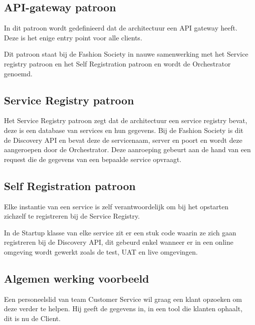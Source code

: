 \subsection{API-gateway patroon}
\label{subsec:API-gateway patroon}

 In dit patroon wordt gedefinieerd dat de architectuur een API gateway heeft. Deze is het enige entry point voor alle clients. \autocite{Richardsonb}
 
 Dit patroon staat bij de Fashion Society in nauwe samenwerking met het Service registry patroon en het Self Registration patroon en wordt de Orchestrator genoemd.
 
 \subsection{Service Registry patroon}
 \label{subsec:Service Registry patroon}
 
 Het Service Registry patroon zegt dat de architectuur een service registry bevat, deze is een database van services en hun gegevens. \autocite{Richardsona} Bij de Fashion Society is dit de Discovery API en bevat deze de servicenaam, server en poort en wordt deze aangeroepen door de Orchestrator. Deze aanroeping gebeurt aan de hand van een request die de gegevens van een bepaalde service opvraagt.
 
 \subsection{Self Registration patroon}
 \label{subsec:Self Registration patroon}
 
 Elke instantie van een service is zelf verantwoordelijk om bij het opstarten zichzelf te registreren bij de Service Registry. \autocite{Richardson}
 
 In de Startup klasse van elke service zit er een stuk code waarin ze zich gaan registreren bij de Discovery API, dit gebeurd enkel wanneer er in een online omgeving wordt gewerkt zoals de test, UAT en live omgevingen.
 
 \subsection{Algemen werking voorbeeld}
 \label{subsec:Algemene werking voorbeeld}
 
 Een personeelslid van team Customer Service wil graag een klant opzoeken om deze verder te helpen. Hij geeft de gegevens in, in een tool die klanten ophaalt, dit is nu de Client. 
 
